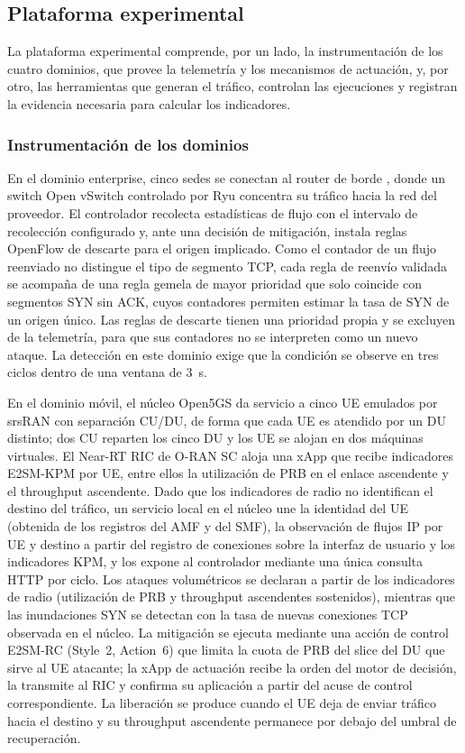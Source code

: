 \subsection{Plataforma experimental}
\label{subsec:plataforma}

La plataforma experimental comprende, por un lado, la instrumentación de los cuatro dominios, que provee la telemetría y los mecanismos de actuación, y, por otro, las herramientas que generan el tráfico, controlan las ejecuciones y registran la evidencia necesaria para calcular los indicadores.

\subsubsection{Instrumentación de los dominios}

En el dominio enterprise, cinco sedes se conectan al router de borde , donde un switch Open vSwitch controlado por Ryu concentra su tráfico hacia la red del proveedor. El controlador recolecta estadísticas de flujo con el intervalo de recolección configurado y, ante una decisión de mitigación, instala reglas OpenFlow de descarte para el origen implicado. Como el contador de un flujo reenviado no distingue el tipo de segmento TCP, cada regla de reenvío validada se acompaña de una regla gemela de mayor prioridad que solo coincide con segmentos SYN sin ACK, cuyos contadores permiten estimar la tasa de SYN de un origen único. Las reglas de descarte tienen una prioridad propia y se excluyen de la telemetría, para que sus contadores no se interpreten como un nuevo ataque. La detección en este dominio exige que la condición se observe en tres ciclos dentro de una ventana de 3~s.

En el dominio móvil, el núcleo Open5GS da servicio a cinco UE emulados por srsRAN con separación CU/DU, de forma que cada UE es atendido por un DU distinto; dos CU reparten los cinco DU y los UE se alojan en dos máquinas virtuales. El Near-RT RIC de O-RAN SC aloja una xApp que recibe indicadores E2SM-KPM por UE, entre ellos la utilización de PRB en el enlace ascendente y el throughput ascendente. Dado que los indicadores de radio no identifican el destino del tráfico, un servicio local en el núcleo une la identidad del UE (obtenida de los registros del AMF y del SMF), la observación de flujos IP por UE y destino a partir del registro de conexiones sobre la interfaz de usuario y los indicadores KPM, y los expone al controlador mediante una única consulta HTTP por ciclo. Los ataques volumétricos se declaran a partir de los indicadores de radio (utilización de PRB y throughput ascendentes sostenidos), mientras que las inundaciones SYN se detectan con la tasa de nuevas conexiones TCP observada en el núcleo. La mitigación se ejecuta mediante una acción de control E2SM-RC (Style~2, Action~6) que limita la cuota de PRB del slice del DU que sirve al UE atacante; la xApp de actuación recibe la orden del motor de decisión, la transmite al RIC y confirma su aplicación a partir del acuse de control correspondiente. La liberación se produce cuando el UE deja de enviar tráfico hacia el destino y su throughput ascendente permanece por debajo del umbral de recuperación.

